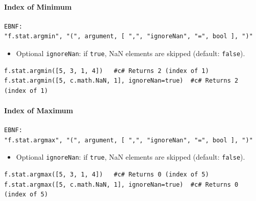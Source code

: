 \paragraph{Index of Minimum}
\begin{verbatim}
EBNF:
"f.stat.argmin", "(", argument, [ ",", "ignoreNan", "=", bool ], ")"
\end{verbatim}
\begin{itemize}
\item Optional \texttt{ignoreNan}: if \texttt{true}, NaN elements are skipped (default: \texttt{false}).
\end{itemize}
\begin{verbatim}
f.stat.argmin([5, 3, 1, 4])   #c# Returns 2 (index of 1)
f.stat.argmin([5, c.math.NaN, 1], ignoreNan=true)  #c# Returns 2 (index of 1)
\end{verbatim}

\paragraph{Index of Maximum}
\begin{verbatim}
EBNF:
"f.stat.argmax", "(", argument, [ ",", "ignoreNan", "=", bool ], ")"
\end{verbatim}
\begin{itemize}
\item Optional \texttt{ignoreNan}: if \texttt{true}, NaN elements are skipped (default: \texttt{false}).
\end{itemize}
\begin{verbatim}
f.stat.argmax([5, 3, 1, 4])   #c# Returns 0 (index of 5)
f.stat.argmax([5, c.math.NaN, 1], ignoreNan=true)  #c# Returns 0 (index of 5)
\end{verbatim}

